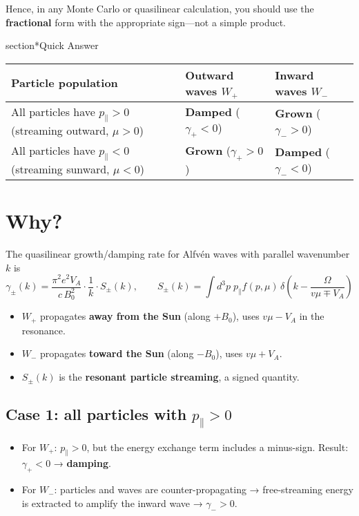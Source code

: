 Hence, in any Monte Carlo or quasilinear calculation, you should use the \textbf{fractional} form with the appropriate sign—not a simple product.

section*{Quick Answer}

\begin{center}
\begin{tabular}{@{}lll@{}}
\toprule
\textbf{Particle population} & \textbf{Outward waves $W_+$} & \textbf{Inward waves $W_-$} \\
\midrule
All particles have $p_\parallel > 0$ (streaming outward, $\mu > 0$)
  & \textbf{Damped} ($\gamma_+ < 0$)
  & \textbf{Grown} ($\gamma_- > 0$) \\
All particles have $p_\parallel < 0$ (streaming sunward, $\mu < 0$)
  & \textbf{Grown} ($\gamma_+ > 0$)
  & \textbf{Damped} ($\gamma_- < 0$) \\
\bottomrule
\end{tabular}
\end{center}

\section*{Why?}

The quasilinear growth/damping rate for Alfvén waves with parallel wavenumber $k$ is
\[
\boxed{
\gamma_\pm(k) =
\frac{\pi^{2} e^{2} V_A}{c\, B_0^{2}} \cdot
\frac{1}{k} \cdot
S_\pm(k),
\qquad
S_\pm(k) = \int d^3p \; p_\parallel f(p, \mu) \,
\delta\left(k - \frac{\Omega}{v \mu \mp V_A}\right)
} \tag{1}
\]

\begin{itemize}
  \item $W_+$ propagates \textbf{away from the Sun} (along $+B_0$), uses $v\mu - V_A$ in the resonance.
  \item $W_-$ propagates \textbf{toward the Sun} (along $-B_0$), uses $v\mu + V_A$.
  \item $S_\pm(k)$ is the \textbf{resonant particle streaming}, a signed quantity.
\end{itemize}

\subsection*{Case 1: all particles with $p_\parallel > 0$}

\begin{itemize}
  \item For $W_+$: $p_\parallel > 0$, but the energy exchange term includes a minus-sign. Result: $\gamma_+ < 0$ → \textbf{damping}.
  \item For $W_-$: particles and waves are counter-propagating → free-streaming energy is extracted to amplify the inward wave → $\gamma_- > 0$.
\end{itemize}


